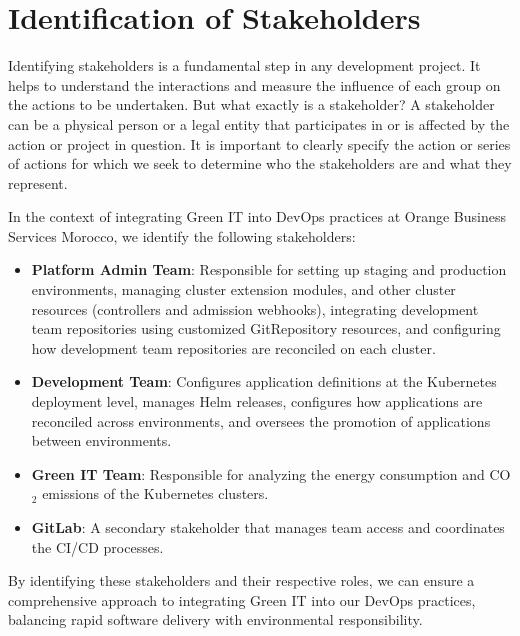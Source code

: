 \newpage


\section{Identification of Stakeholders}
\label{subsec:identification_stakeholders}

Identifying stakeholders is a fundamental step in any development project. It helps to understand the interactions and measure the influence of each group on the actions to be undertaken. But what exactly is a stakeholder? A stakeholder can be a physical person or a legal entity that participates in or is affected by the action or project in question. It is important to clearly specify the action or series of actions for which we seek to determine who the stakeholders are and what they represent.

In the context of integrating Green IT into DevOps practices at Orange Business Services Morocco, we identify the following stakeholders:

\begin{itemize}
  \item \textbf{Platform Admin Team}: Responsible for setting up staging and production environments, managing cluster extension modules, and other cluster resources (controllers and admission webhooks), integrating development team repositories using customized GitRepository resources, and configuring how development team repositories are reconciled on each cluster.
  
  \item \textbf{Development Team}: Configures application definitions at the Kubernetes deployment level, manages Helm releases, configures how applications are reconciled across environments, and oversees the promotion of applications between environments.
  
  \item \textbf{Green IT Team}: Responsible for analyzing the energy consumption and CO$_2$ emissions of the Kubernetes clusters. 
  
  \item \textbf{GitLab}: A secondary stakeholder that manages team access and coordinates the CI/CD processes.
\end{itemize}

By identifying these stakeholders and their respective roles, we can ensure a comprehensive approach to integrating Green IT into our DevOps practices, balancing rapid software delivery with environmental responsibility.


